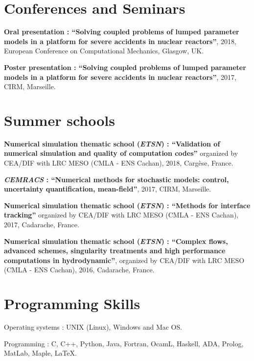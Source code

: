 \documentclass{article}
\renewenvironment{itemize}{
  \begin{list}{}{
      \setlength{\leftmargin}{1.5em}
      \setlength{\itemsep}{0.25em}
      \setlength{\parskip}{0pt}
      \setlength{\parsep}{0.25em}
    }
}{
  \end{list}
}
\begin{document}
\section*{Conferences and Seminars}
\begin{itemize}
	\item \textbf{Oral presentation : ``Solving coupled problems of lumped parameter models in a platform for severe accidents in nuclear reactors''}, 2018, European Conference on Computational Mechanics, Glasgow, UK.
	\item \textbf{Poster presentation : ``Solving coupled problems of lumped parameter models in a platform for severe accidents in nuclear reactors''}, 2017, CIRM, Marseille.
\end{itemize}  

\section*{Summer schools}
\begin{itemize}
	\item \textbf{Numerical simulation thematic school (\textit{ETSN}) : ``Validation of numerical simulation and quality of computation codes''} organized by CEA/DIF with LRC MESO (CMLA - ENS Cachan), 2018, Cargèse, France.
	\item \textbf{\textit{CEMRACS} : ``Numerical methods for stochastic models: control, uncertainty quantification, mean-field''}, 2017, CIRM, Marseille.
	\item \textbf{Numerical simulation thematic school (\textit{ETSN}) : ``Methods for interface tracking''} organized by CEA/DIF with LRC MESO (CMLA - ENS Cachan), 2017, Cadarache, France.
	\item \textbf{Numerical simulation thematic school (\textit{ETSN}) : ``Complex flows, advanced schemes, singularity treatments and high performance computations in hydrodynamic''}, organized by CEA/DIF with LRC MESO (CMLA - ENS Cachan), 2016, Cadarache, France.
\end{itemize}  

\section*{Programming Skills}
\begin{itemize}
	\item Operating systems : UNIX (Linux), Windows and Mac OS.
	\item Programming : C, C++, Python, Java, Fortran, OcamL, Haskell, ADA, Prolog, MatLab, Maple, \LaTeX. 
\end{itemize}  
\end{document}
